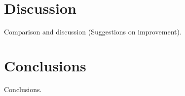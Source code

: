 \section{Discussion}
Comparison and discussion (Suggestions on improvement).


\section{Conclusions}
Conclusions.
